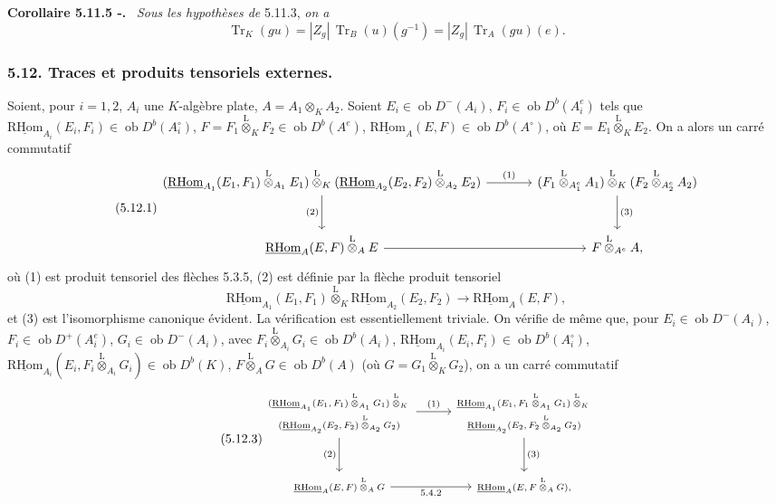 \documentclass[11pt]{article}
\newenvironment{statement}[1]{\par\medskip\noindent\textbf{#1.}\ }{\par\medskip}
\newcommand{\R}{\mathrm{R}}\newcommand{\RHomCore}{\mathrm{RHom}}
\newcommand{\ob}{\operatorname{ob}}
\providecommand{\RHom}{\RHomCore}
\providecommand{\uRHom}{\underline{\RHom}}
\providecommand{\Tr}{\operatorname{Tr}}
\providecommand{\Tr}{\operatorname{Tr}}
\providecommand{\lten}{\overset{\mathrm L}{\otimes}}
\providecommand{\Tr}{\operatorname{Tr}}
\providecommand{\RHom}{\RHomCore}
\providecommand{\ob}{\operatorname{ob}}
\providecommand{\lten}{\overset{\mathrm L}{\otimes}}
\providecommand{\RHom}{\R\mathcal{H}om}
\providecommand{\lten}{\overset{\mathrm L}{\otimes}}
\providecommand{\R}{\mathrm R}
\providecommand{\Tr}{\operatorname{Tr}}
\providecommand{\lten}{\overset{\mathrm L}{\otimes}}
\providecommand{\lten}{\overset{\mathrm L}{\otimes}}
\providecommand{\lten}{\overset{\mathrm L}{\otimes}}
\providecommand{\RHom}{\RHomCore}
\providecommand{\Tr}{\operatorname{Tr}}
\providecommand{\lten}{\overset{\mathrm L}{\otimes}}
\begin{document}
\begin{statement}{Corollaire 5.11.5 -}
\emph{Sous les hypothèses de} 5.11.3, \emph{on a}
\[
\Tr_K(gu)=|Z_g|\,\Tr_B(u)(g^{-1})=|Z_g|\,\Tr_A(gu)(e).
\]
\end{statement}

\subsubsection*{5.12. Traces et produits tensoriels externes.}

Soient, pour $i=1,2$, $A_i$ une $K$-algèbre plate, $A=A_1\otimes_KA_2$. Soient $E_i\in\ob D^-(A_i)$, $F_i\in\ob D^b(A_i^e)$ tels que $\uRHom_{A_i}(E_i,F_i)\in\ob D^b(A_i^\circ)$, $F=F_1\lten_KF_2\in\ob D^b(A^e)$, $\uRHom_A(E,F)\in\ob D^b(A^\circ)$, où $E=E_1\lten_KE_2$. On a alors un carré commutatif
\begin{equation}\tag{5.12.1}
\begin{tikzcd}[column sep=large,row sep=large]
(\uRHom_{A_1}(E_1,F_1)\lten_{A_1}E_1)\lten_K(\uRHom_{A_2}(E_2,F_2)\lten_{A_2}E_2) \arrow[r,"(1)"] \arrow[d,"(2)"'] & (F_1\lten_{A_1^e}A_1)\lten_K(F_2\lten_{A_2^e}A_2) \arrow[d,"(3)"]\\
\uRHom_A(E,F)\lten_AE \arrow[r] & F\lten_{A^e}A,
\end{tikzcd}
\end{equation}
où (1) est produit tensoriel des flèches 5.3.5, (2) est définie par la flèche produit tensoriel
\begin{equation}\tag{5.12.2}
\uRHom_{A_1}(E_1,F_1)\lten_K\uRHom_{A_2}(E_2,F_2)\longrightarrow\uRHom_A(E,F),
\end{equation}
et (3) est l'isomorphisme canonique évident. La vérification est essentiellement triviale. On vérifie de même que, pour $E_i\in\ob D^-(A_i)$, $F_i\in\ob D^+(A_i^e)$, $G_i\in\ob D^-(A_i)$, avec $F_i\lten_{A_i}G_i\in\ob D^b(A_i)$, $\uRHom_{A_i}(E_i,F_i)\in\ob D^b(A_i^\circ)$, $\uRHom_{A_i}(E_i,F_i\lten_{A_i}G_i)\in\ob D^b(K)$, $F\lten_AG\in\ob D^b(A)$ (où $G=G_1\lten_KG_2$), on a un carré commutatif
\begin{equation}\tag{5.12.3}
\begin{tikzcd}[column sep=2.8em,row sep=large,cells={nodes={font=\scriptsize}},every label/.append style={font=\scriptsize}]
\begin{gathered}
(\uRHom_{A_1}(E_1,F_1)\lten_{A_1}G_1)\lten_K{}\\[-.15em]
(\uRHom_{A_2}(E_2,F_2)\lten_{A_2}G_2)
\end{gathered}
\arrow[r,"(1)"] \arrow[d,"(2)"']
&
\begin{gathered}
\uRHom_{A_1}(E_1,F_1\lten_{A_1}G_1)\lten_K{}\\[-.15em]
\uRHom_{A_2}(E_2,F_2\lten_{A_2}G_2)
\end{gathered}
\arrow[d,"(3)"]\\
\uRHom_A(E,F)\lten_AG \arrow[r,"5.4.2"'] & \uRHom_A(E,F\lten_AG),
\end{tikzcd}
\end{equation}
\end{document}
